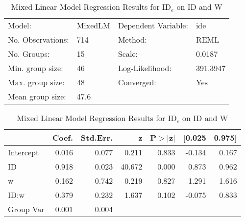 \documentclass{article}
\begin{document}
\begin{table}
	\caption{Mixed Linear Model Regression Results for ID$_e$ on ID and W}
	\label{tab:fit_jgp_ide_id_w}
	\begin{center}
		\begin{tabular}{llll}
			\hline
			Model:            & MixedLM & Dependent Variable: & ide       \\
			No. Observations: & 714     & Method:             & REML      \\
			No. Groups:       & 15      & Scale:              & 0.0187    \\
			Min. group size:  & 46      & Log-Likelihood:     & 391.3947  \\
			Max. group size:  & 48      & Converged:          & Yes       \\
			Mean group size:  & 47.6    &                     &           \\
			\hline
			\end{tabular}
			\end{center}
			
			\begin{center}
			\begin{tabular}{lrrrrrr}
			\hline
					  & Coef. & Std.Err. &      z & P$> |$z$|$ & [0.025 & 0.975]  \\
			\hline
			Intercept & 0.016 &    0.077 &  0.211 &       0.833 & -0.134 &  0.167  \\
			ID        & 0.918 &    0.023 & 40.672 &       0.000 &  0.873 &  0.962  \\
			w         & 0.162 &    0.742 &  0.219 &       0.827 & -1.291 &  1.616  \\
			ID:w      & 0.379 &    0.232 &  1.637 &       0.102 & -0.075 &  0.833  \\
			Group Var & 0.001 &    0.004 &        &             &        &         \\
			\hline
			\end{tabular}
			\end{center}
			\end{table}
			
\end{document}
